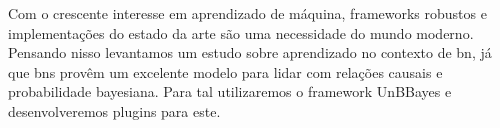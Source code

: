 Com o crescente interesse em aprendizado de máquina, frameworks robustos e implementações do estado da arte são uma necessidade do mundo moderno. Pensando nisso levantamos um estudo sobre aprendizado no contexto de \gls{bn}, já que \glspl{bn} provêm um excelente modelo para lidar com relações causais e probabilidade bayesiana. Para tal utilizaremos o framework UnBBayes e desenvolveremos plugins para este.
